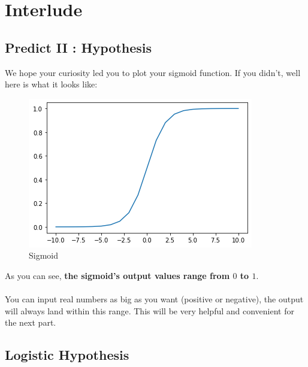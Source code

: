 
\section*{Interlude}
\subsection*{Predict II : Hypothesis}

We hope your curiosity led you to plot your sigmoid function.
If you didn't, well here is what it looks like:

\begin{figure}[!h]
    \centering
    \includegraphics[scale=0.55]{assets/sigmoid.png}
    \caption{Sigmoid}
\end{figure}
As you can see, \textbf{the sigmoid's output values range from $0$ to $1$}.\\
\\
You can input real numbers as big as you want (positive or negative), the output 
will always land within this range.
This will be very helpful and convenient for the next part.

\newpage

\subsection*{Logistic Hypothesis}

